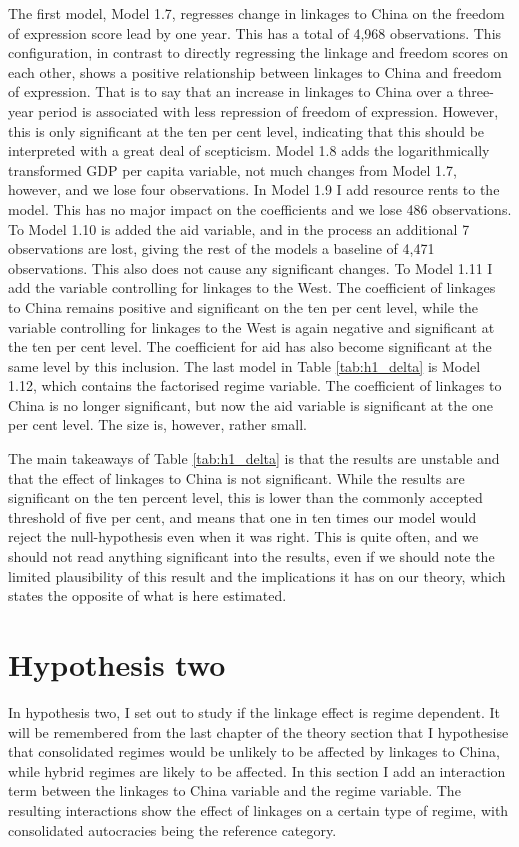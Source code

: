 The first model, Model 1.7, regresses change in linkages to China on the freedom of expression score lead by one year. This has a total of 4,968 observations. This configuration, in contrast to directly regressing the linkage and freedom scores on each other, shows a positive relationship between linkages to China and freedom of expression. That is to say that an increase in linkages to China over a three-year period is associated with less repression of freedom of expression. However, this is only significant at the ten per cent level, indicating that this should be interpreted with a great deal of scepticism. Model 1.8 adds the logarithmically transformed GDP per capita variable, not much changes from Model 1.7, however, and we lose four observations. In Model 1.9 I add resource rents to the model. This has no major impact on the coefficients and we lose 486 observations. To Model 1.10 is added the aid variable, and in the process an additional 7 observations are lost, giving the rest of the models a baseline of 4,471 observations. This also does not cause any significant changes. To Model 1.11 I add the variable controlling for linkages to the West. The coefficient of linkages to China remains positive and significant on the ten per cent level, while the variable controlling for linkages to the West is again negative and significant at the ten per cent level. The coefficient for aid has also become significant at the same level by this inclusion. The last model in Table \ref{tab:h1_delta} is Model 1.12, which contains the factorised regime variable. The coefficient of linkages to China is no longer significant, but now the aid variable is significant at the one per cent level. The size is, however, rather small. 

The main takeaways of Table \ref{tab:h1_delta} is that the results are unstable and that the effect of linkages to China is not significant. While the results are significant on the ten percent level, this is lower than the commonly accepted threshold of five per cent, and means that one in ten times our model would reject the null-hypothesis even when it was right. This is quite often, and we should not read anything significant into the results, even if we should note the limited plausibility of this result and the implications it has on our theory, which states the opposite of what is here estimated.

\section{Hypothesis two} \label{sec:h2}
In hypothesis two, I set out to study if the linkage effect is regime dependent. It will be remembered from the last chapter of the theory section that I hypothesise that consolidated regimes would be unlikely to be affected by linkages to China, while hybrid regimes are likely to be affected. In this section I add an interaction term between the linkages to China variable and the regime variable. The resulting interactions show the effect of linkages on a certain type of regime, with consolidated autocracies being the reference category.

